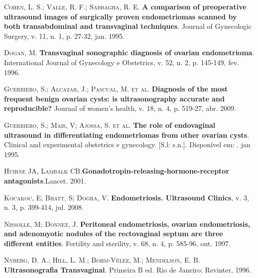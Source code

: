 \documentclass[12pt]{article} %
\begin{document}
\vspace{0,5cm}

\textsc{Cohen, L. S.; Valle, R. F.; Sabbagha, R. E}.\textbf{ A comparison of preoperative ultrasound images of surgically proven endometriomas scanned by both transabdominal and transvaginal techniques}. Journal of Gynecologic Surgery, v. 11, n. 1, p. 27-32, jan. 1995.

\vspace{0,5cm}

\textsc{Dogan, M}.\textbf{ Transvaginal sonographic diagnosis of ovarian endometrioma}. International Journal of Gynecology e Obstetrics, v. 52, n. 2, p. 145-149, fev. 1996.

\vspace{0,5cm}

\textsc{Guerriero, S.; Alcazar, J.; Pascual, M. et al}.\textbf{ Diagnosis of the most frequent benign ovarian cysts: is ultrasonography accurate and reproducible?} Journal of women’s health, v. 18, n. 4, p. 519-27, abr. 2009.

\vspace{0,5cm}

\textsc{Guerriero, S.; Mais, V; Ajossa, S. et al}.\textbf{ The role of endovaginal ultrasound in differentiating endometriomas from other ovarian cysts}. Clinical and experimental obstetrics e gynecology. [S.l: s.n.]. Disponível em: . jan 1995.

\vspace{0,5cm}

\textsc{Huirne JA, Lambalk CB}.\textbf{Gonadotropin-releasing-hormone-receptor antagonists}.Lancet. 2001.

\vspace{0,5cm}

\textsc{Kocakoc, E; Bhatt, S; Dogra, V}.\textbf{ Endometriosis. Ultrasound Clinics}, v. 3, n. 3, p. 399-414, jul. 2008.

\vspace{0,5cm}

\textsc{Nissolle, M; Donnez, J}.\textbf{ Peritoneal endometriosis, ovarian endometriosis, and adenomyotic nodules of the rectovaginal septum are three different entities}. Fertility and sterility, v. 68, n. 4, p. 585-96, out. 1997.

\vspace{0,5cm}

\textsc{Nyberg, D. A.; Hill, L. M.; Bohm-Vélez, M.; Mendelson, E. B}.\textbf{ Ultrasonografia Transvaginal}. Primeira B ed. Rio de Janeiro: Revinter, 1996.
\end{document}

